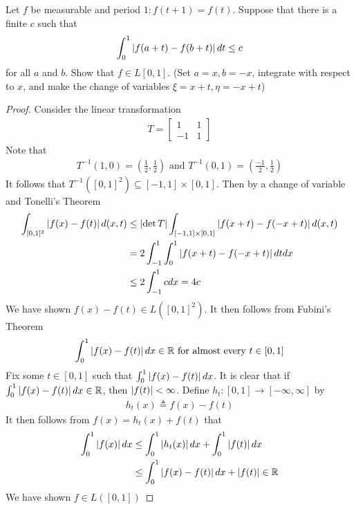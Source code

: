 \documentclass{report}
\begin{document}
\begin{question}{}{}
Let $f$ be measurable and period $1:f(t+1)=f(t)$. Suppose that there is a finite $c$ such that 
\begin{align*}
\int_0^1 \left|f(a+t)-f(b+t)\right|dt \leq c
\end{align*}
for all $a$ and $b$. Show that  $f \in L[0,1]$. (Set $a=x,b=-x$, integrate with respect to $x$, and make the change of variables  $\xi =x+t,\eta =-x +t $)
\end{question}
\begin{proof}
Consider the linear transformation 
\begin{align*}
T= \begin{bmatrix}
 1 & 1\\
 -1 & 1
\end{bmatrix}
\end{align*}
Note that 
\begin{align*}
T^{-1}(1,0)=(\frac{1}{2},\frac{1}{2})\text{ and }T^{-1}(0,1)=(\frac{-1}{2},\frac{1}{2})
\end{align*}
It follows that $T^{-1}([0,1]^2)\subseteq [-1,1]\times [0,1] $. Then by a change of variable and Tonelli's Theorem
\begin{align*}
  \int_{[0,1]^2}\left|f(x)-f(t) \right| d(x,t )&\leq   \left|\operatorname{det}T\right|\int_{[-1,1]\times [0,1]} \left|f(x+t)-f(-x+t)\right|  d(x,t)  \\
  &=  2\int_{-1}^1 \int_{0}^1 \left|f(x+t)-f(-x+t)\right|dtdx \\
  &\leq 2\int_{-1}^{1} cdx=4c
\end{align*}
We have shown $f(x)-f(t)\in L([0,1]^2)$. It then follows from Fubini's Theorem 
\begin{align*}
\int_0^1 \left|f(x)-f(t)\right|dx \in\mathbb{R} \text{ for almost every }t \in [0,1]
\end{align*}
Fix some $t \in [0,1]$ such that $\int_0^1 \left|f(x)-f(t)\right|dx$. It is clear that if $\int_0^1 \left|f(x)-f(t)\right|dx \in\mathbb{R}$, then $\left|f(t)\right|<\infty$. Define  $h_t:[0,1]\rightarrow [-\infty,\infty]$ by 
\begin{align*}
h_t(x)\triangleq f(x)-f(t)
\end{align*}
It then follows from $f(x)=h_t(x)+f(t)$ that 
\begin{align*}
  \int_0^1 \left|f(x)\right|dx&\leq \int_0^1 \left|h_t(x)\right|dx + \int_0^1 \left|f(t)\right|dx  \\
  &\leq \int_0^1 \left|f(x)-f(t)\right|dx + \left|f(t)\right|\in\mathbb{R}
\end{align*}
We have shown $f \in L([0,1])$

\end{proof}
\end{document}
